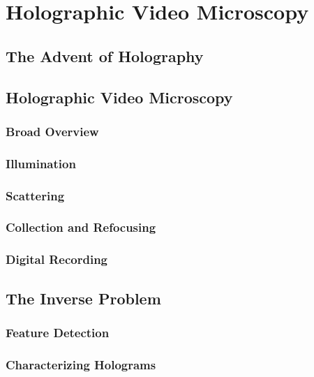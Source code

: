 \chapter{Holographic Video Microscopy}
\label{ch:hvm}

\section{The Advent of Holography}


\section{Holographic Video Microscopy}
\subsection{Broad Overview}

\subsection{Illumination}

\subsection{Scattering}

\subsection{Collection and Refocusing}

\subsection{Digital Recording}

\section{The Inverse Problem}

\subsection{Feature Detection}

\subsection{Characterizing Holograms}
